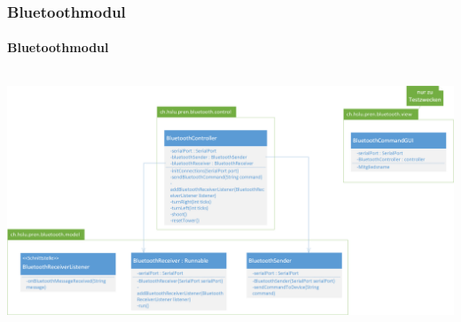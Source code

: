 \begin{frame}
    \frametitle{Bluetoothmodul}
    \framesubtitle{Bluetoothmodul}
    \begin{columns}
        \begin{column}{1\textwidth}
            \centering
            \includegraphics[width=1.0\textwidth]{../fig/Klassendiagramm_Bluetoothmodul.png}
        \end{column}
    \end{columns}
\end{frame}

